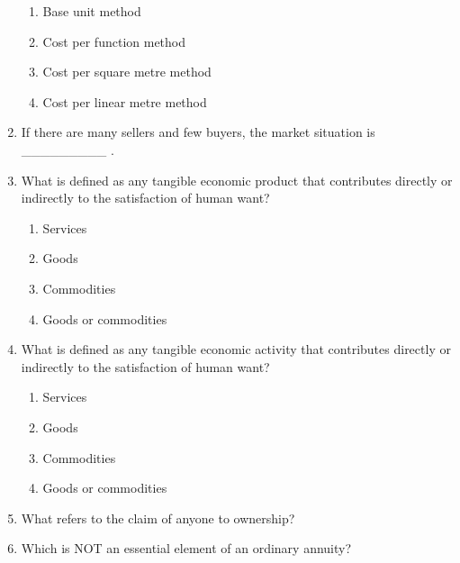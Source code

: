 \documentclass[11pt,a4paper]{article}
\begin{document}
\begin{enumerate}
\begin{enumerate}[label=\Alph*.]
\item{Base unit method}
\item{Cost per function method}
\item{Cost per square metre method}
\item{Cost per linear metre method}
\end{enumerate}
\item{If there are many sellers and few buyers, the market situation is \_\_\_\_\_\_\_\_\_ .}
\\
\item{What is defined as any tangible economic product that contributes directly or indirectly to the satisfaction of human want?}
\begin{enumerate}[label=\Alph*.]
\item{Services}
\item{Goods}
\item{Commodities}
\item{Goods or commodities}
\end{enumerate}
\item{What is defined as any tangible economic activity that contributes directly or indirectly to the satisfaction of human want?}
\begin{enumerate}[label=\Alph*.]
\item{Services}
\item{Goods}
\item{Commodities}
\item{Goods or commodities}
\end{enumerate}
\item{What refers to the claim of anyone to ownership?}
\\
\item{Which is NOT an essential element of an ordinary annuity?}
\begin{enumerate}[label=\Alph*.]

\end{enumerate}
\end{enumerate}
\end{document}
